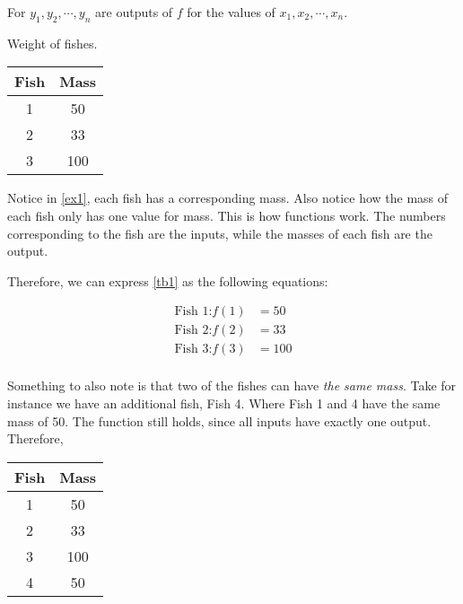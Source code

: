 For \(y_1, y_2, \cdots, y_n\) are outputs of \(f\) for the values of \(x_1, x_2, \cdots, x_n\).

\begin{ex}
    \label{ex1}
    Weight of fishes.
\end{ex}

\begin{center}
    \begin{tabular}{cc}
        \toprule
        Fish & Mass \\
        \midrule
        1 & 50 \\
        2 & 33 \\
        3 & 100 \\
        \bottomrule
    \end{tabular}
    \label{tb1}
\end{center}

Notice in \cref{ex1}, each fish has a corresponding mass. Also notice how the mass of each fish only has one value for mass. This is how functions work. The numbers corresponding to the fish are the inputs, while the masses of each fish are the output.

Therefore, we can express \cref{tb1} as the following equations:

\begin{align*}
    \text{Fish 1:} f(1) &= 50 \\
    \text{Fish 2:} f(2) &= 33 \\
    \text{Fish 3:} f(3) &= 100 \\    
\end{align*}

Something to also note is that two of the fishes can have \emph{the same mass}. Take for instance we have an additional fish, Fish 4. Where Fish 1 and 4 have the same mass of 50. The function still holds, since all inputs have exactly one output. Therefore,

\begin{center}
    \begin{tabular}{cc}
        \toprule
        Fish & Mass \\
        \midrule
        1 & 50 \\
        2 & 33 \\
        3 & 100 \\
        4 & 50 \\
        \bottomrule
    \end{tabular}
\end{center}

